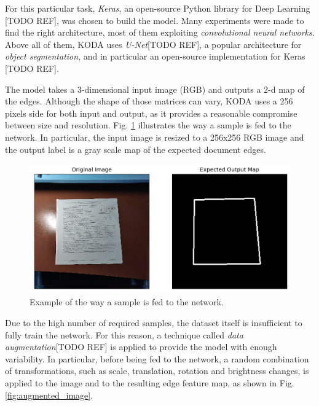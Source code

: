 \documentclass[]{article}
\begin{document}
For this particular task, \textit{Keras}, an open-source Python library for Deep Learning [TODO REF], was chosen to build the model. Many experiments were made to find the right architecture, most of them 
exploiting \textit{convolutional neural networks}. Above all of them, KODA uses \textit{U-Net}[TODO REF], a popular architecture for \textit{object segmentation}, and in particular an open-source implementation for Keras [TODO REF].

The model takes a 3-dimensional input image (RGB) and outputs a 2-d map of the edges. Although the shape
of those matrices can vary, KODA uses a 256 pixels side for both input and output, as it provides a reasonable compromise between size and resolution. Fig. \ref{fig:label_edge} illustrates the way a
sample is fed to the network. In particular, the input image is resized to a 256x256 RGB image and the
output label is a gray scale map of the expected document edges.

\begin{figure}[htb!]
	\includegraphics[width=\linewidth]{label_edge.png}
	\caption{Example of the way a sample is fed to the network.}
	\label{fig:label_edge}
\end{figure}

Due to the high number of required samples, the dataset itself is insufficient to fully train the network.
For this reason, a technique called \textit{data augmentation}[TODO REF] is applied to provide the model
with enough variability. In particular, before being fed to the network, a random combination of transformations, such as scale, translation, rotation and brightness changes, is applied to the image and to the resulting edge feature map, as shown in Fig. \ref{fig:augmented_image}.
\end{document}
